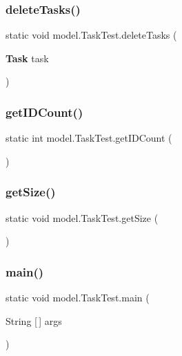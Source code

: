 \mbox{\label{classmodel_1_1_task_test_af66644ce280edf3da9208613bfed8660}} 
\subsubsection{delete\+Tasks()}
{\footnotesize\ttfamily static void model.\+Task\+Test.\+delete\+Tasks (\begin{DoxyParamCaption}\item[{\textbf{ Task}}]{task }\end{DoxyParamCaption})\hspace{0.3cm}{\ttfamily [static]}}

\mbox{\label{classmodel_1_1_task_test_ae5e39836bc7eea7256653c0ba830dfdc}} 
\subsubsection{get\+I\+D\+Count()}
{\footnotesize\ttfamily static int model.\+Task\+Test.\+get\+I\+D\+Count (\begin{DoxyParamCaption}{ }\end{DoxyParamCaption})\hspace{0.3cm}{\ttfamily [static]}}

\mbox{\label{classmodel_1_1_task_test_a947e417a5547a484ba79c220eeb9004e}} 
\subsubsection{get\+Size()}
{\footnotesize\ttfamily static void model.\+Task\+Test.\+get\+Size (\begin{DoxyParamCaption}{ }\end{DoxyParamCaption})\hspace{0.3cm}{\ttfamily [static]}}

\mbox{\label{classmodel_1_1_task_test_a556e16e1f358d215d196dea83babac6b}} 
\subsubsection{main()}
{\footnotesize\ttfamily static void model.\+Task\+Test.\+main (\begin{DoxyParamCaption}\item[{String [$\,$]}]{args }\end{DoxyParamCaption})\hspace{0.3cm}{\ttfamily [static]}}

